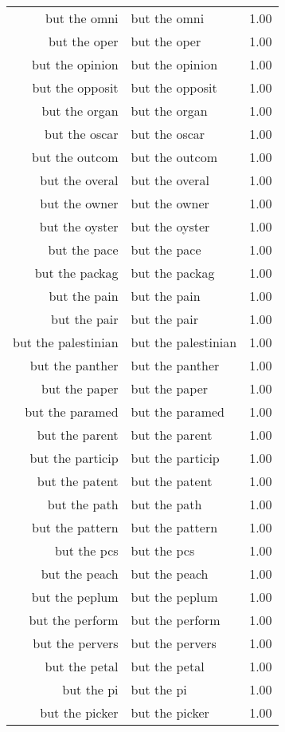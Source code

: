 \begin{table}[ht]
\begin{tabular}{rlr}
  but the omni & but the omni & 1.00 \\ 
  but the oper & but the oper & 1.00 \\ 
  but the opinion & but the opinion & 1.00 \\ 
  but the opposit & but the opposit & 1.00 \\ 
  but the organ & but the organ & 1.00 \\ 
  but the oscar & but the oscar & 1.00 \\ 
  but the outcom & but the outcom & 1.00 \\ 
  but the overal & but the overal & 1.00 \\ 
  but the owner & but the owner & 1.00 \\ 
  but the oyster & but the oyster & 1.00 \\ 
  but the pace & but the pace & 1.00 \\ 
  but the packag & but the packag & 1.00 \\ 
  but the pain & but the pain & 1.00 \\ 
  but the pair & but the pair & 1.00 \\ 
  but the palestinian & but the palestinian & 1.00 \\ 
  but the panther & but the panther & 1.00 \\ 
  but the paper & but the paper & 1.00 \\ 
  but the paramed & but the paramed & 1.00 \\ 
  but the parent & but the parent & 1.00 \\ 
  but the particip & but the particip & 1.00 \\ 
  but the patent & but the patent & 1.00 \\ 
  but the path & but the path & 1.00 \\ 
  but the pattern & but the pattern & 1.00 \\ 
  but the pcs & but the pcs & 1.00 \\ 
  but the peach & but the peach & 1.00 \\ 
  but the peplum & but the peplum & 1.00 \\ 
  but the perform & but the perform & 1.00 \\ 
  but the pervers & but the pervers & 1.00 \\ 
  but the petal & but the petal & 1.00 \\ 
  but the pi & but the pi & 1.00 \\ 
  but the picker & but the picker & 1.00 \\ 

\end{tabular}
\end{table}
